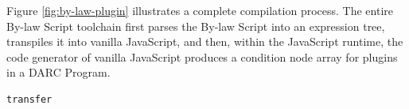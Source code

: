 \documentclass[main.tex]{subfiles}
\begin{document}
Figure \ref{fig:by-law-plugin} illustrates a complete compilation process. The entire By-law Script toolchain first parses the By-law Script into an expression tree, transpiles it into vanilla JavaScript, and then, within the JavaScript runtime, the code generator of vanilla JavaScript produces a condition node array for plugins in a DARC Program. 





\begin{verbatim}
transfer
\end{verbatim}
\end{document}
